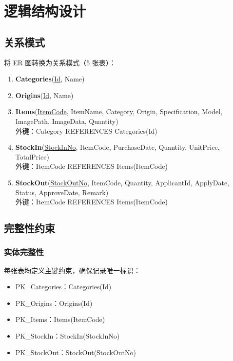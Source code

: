 \documentclass[12pt,a4paper]{ctexart}
\begin{document}
\section{逻辑结构设计}

\subsection{关系模式}

将 ER 图转换为关系模式（5 张表）：

\begin{enumerate}
    \item \textbf{Categories}(\underline{Id}, Name)
    \item \textbf{Origins}(\underline{Id}, Name)
    \item \textbf{Items}(\underline{ItemCode}, ItemName, Category, Origin, Specification, Model, ImagePath, ImageData, Quantity)\\
    外键：Category REFERENCES Categories(Id)
    \item \textbf{StockIn}(\underline{StockInNo}, ItemCode, PurchaseDate, Quantity, UnitPrice, TotalPrice)\\
    外键：ItemCode REFERENCES Items(ItemCode)
    \item \textbf{StockOut}(\underline{StockOutNo}, ItemCode, Quantity, ApplicantId, ApplyDate, Status, ApproveDate, Remark)\\
    外键：ItemCode REFERENCES Items(ItemCode)
\end{enumerate}

\subsection{完整性约束}

\subsubsection{实体完整性}

每张表均定义主键约束，确保记录唯一标识：

\begin{itemize}
    \item PK\_Categories：Categories(Id)
    \item PK\_Origins：Origins(Id)
    \item PK\_Items：Items(ItemCode)
    \item PK\_StockIn：StockIn(StockInNo)
    \item PK\_StockOut：StockOut(StockOutNo)
\end{itemize}
\end{document}
